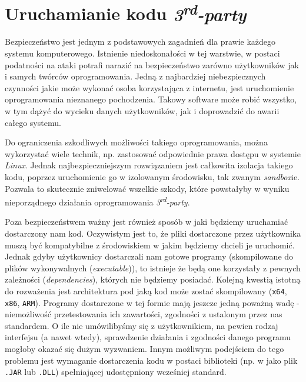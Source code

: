 \section{Uruchamianie kodu \emph{3\textsuperscript{rd}-party}}

\par Bezpieczeństwo jest jednym z podstawowych zagadnień dla prawie każdego systemu komputerowego. Istnienie niedoskonałości w tej warstwie, w postaci podatności na ataki potrafi narazić na bezpieczeństwo zarówno użytkowników jak i samych twórców oprogramowania. Jedną z najbardziej niebezpiecznych czynności jakie może wykonać osoba korzystająca z internetu, jest uruchomienie oprogramowania nieznanego pochodzenia. Takowy software może robić wszystko, w tym dążyć do wycieku danych użytkowników, jak i doprowadzić do awarii całego systemu.

\par Do ograniczenia szkodliwych możliwości takiego oprogramowania, można wykorzystać wiele technik, np. zastosować odpowiednie prawa dostępu w systemie \emph{Linux}. Jednak najbezpieczniejszym rozwiązaniem jest całkowita izolacja takiego kodu, poprzez uruchomienie go w izolowanym środowisku, tak zwanym \emph{sandbox}ie. Pozwala to skutecznie zniwelować wszelkie szkody, które powstałyby w wyniku nieporządnego działania oprogramowania \emph{3\textsuperscript{rd}-party}.

\par Poza bezpieczeństwem ważny jest również sposób w jaki będziemy uruchamiać dostarczony nam kod. Oczywistym jest to, że pliki dostarczone przez użytkownika muszą być kompatybilne z środowiskiem w jakim będziemy chcieli je uruchomić. Jednak gdyby użytkownicy dostarczali nam gotowe programy (skompilowane do plików wykonywalnych (\emph{executable})), to istnieje że będą one korzystały z pewnych zależności (\emph{dependencies}), których nie będziemy posiadać. Kolejną kwestią istotną do rozważenia jest architektura pod jaką kod może zostać skompilowany (\verb|x64|, \verb|x86|, \verb|ARM|). Programy dostarczone w tej formie mają jeszcze jedną poważną wadę - niemożliwość przetestowania ich zawartości, zgodności z ustalonym przez nas standardem. O ile nie umówilibyśmy się z użytkownikiem, na pewien rodzaj interfejsu (a nawet wtedy), sprawdzenie działania i zgodności danego programu mogłoby okazać się dużym wyzwaniem. Innym możliwym podejściem do tego problemu jest wymaganie dostarczenia kodu w postaci biblioteki (np. w jako plik \verb|.JAR| lub \verb|.DLL|) spełniającej udostępniony wcześniej standard.

